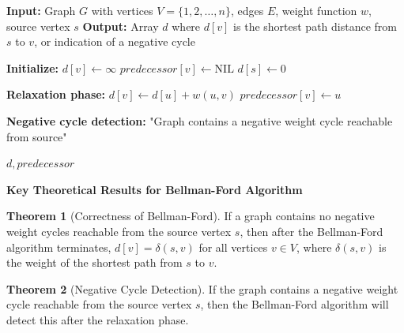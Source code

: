 \documentclass{article}
\theoremstyle{definition}
\newtheorem{theorem}{Theorem}
\begin{document}
\begin{algorithm}[H]
\caption{Bellman-Ford Algorithm}
\begin{algorithmic}[1]
    \State \textbf{Input:} Graph $G$ with vertices $V = \{1, 2, \ldots, n\}$, edges $E$, weight function $w$, source vertex $s$
    \State \textbf{Output:} Array $d$ where $d[v]$ is the shortest path distance from $s$ to $v$, or indication of a negative cycle
    
    \State \textbf{Initialize:}
        \State $d[v] \gets \infty$ 
        \State $predecessor[v] \gets \text{NIL}$ 
    \EndFor
    \State $d[s] \gets 0$ 
    
    \State \textbf{Relaxation phase:}
     
             
                \State $d[v] \gets d[u] + w(u,v)$
                \State $predecessor[v] \gets u$
            \EndIf
        \EndFor
    \EndFor
    
    \State \textbf{Negative cycle detection:}
            \State \Return "Graph contains a negative weight cycle reachable from source"
        \EndIf
    \EndFor
    
    \State \Return $d, predecessor$ 
\EndProcedure
\end{algorithmic}
\end{algorithm}

\noindent\textbf{Key Theoretical Results for Bellman-Ford Algorithm}

\begin{theorem}[Correctness of Bellman-Ford]
If a graph contains no negative weight cycles reachable from the source vertex $s$, then after the Bellman-Ford algorithm terminates, $d[v] = \delta(s,v)$ for all vertices $v \in V$, where $\delta(s,v)$ is the weight of the shortest path from $s$ to $v$.
\end{theorem}

\begin{theorem}[Negative Cycle Detection]
If the graph contains a negative weight cycle reachable from the source vertex $s$, then the Bellman-Ford algorithm will detect this after the relaxation phase.
\end{theorem}
\end{document}
